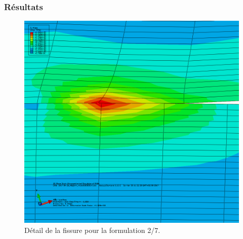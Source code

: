 \documentclass[first,firstsupp,lastsupp,handout,last,hyperref,table]{ETHclass}
\begin{document}
\begin{frame}
\frametitle{R\'esultats}
\vspace{-0.7cm}
\centering
\captionsetup[figure]{font=scriptsize,labelfont=scriptsize}
\begin{figure}[!h]
\centering
\includegraphics[height=0.7\textheight]{detaille-fissure.png}
  \caption{\scriptsize D\'etail de la fissure pour la formulation 2/7.}
  \label{fig:res1}
\end{figure}
\end{frame}
\end{document}
